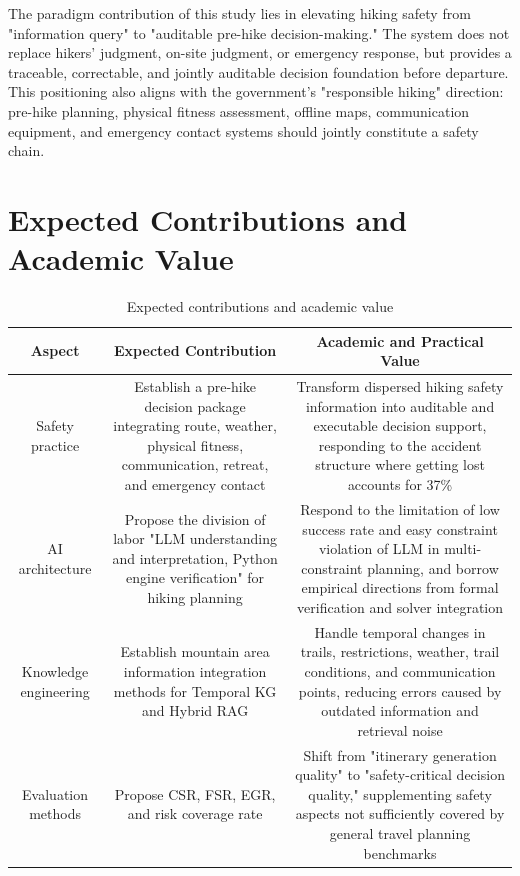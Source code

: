 \documentclass[conference]{IEEEtran}
\begin{document}
The paradigm contribution of this study lies in elevating hiking safety from "information query" to "auditable pre-hike decision-making." The system does not replace hikers' judgment, on-site judgment, or emergency response, but provides a traceable, correctable, and jointly auditable decision foundation before departure. This positioning also aligns with the government's "responsible hiking" direction: pre-hike planning, physical fitness assessment, offline maps, communication equipment, and emergency contact systems should jointly constitute a safety chain.

\section{Expected Contributions and Academic Value}

\begin{table}[htbp]
\caption{Expected contributions and academic value}
\begin{center}
\begin{tabular}{|c|c|c|}
\hline
\textbf{Aspect} & \textbf{Expected Contribution} & \textbf{Academic and Practical Value} \\
\hline
Safety practice & Establish a pre-hike decision package integrating route, weather, physical fitness, communication, retreat, and emergency contact & Transform dispersed hiking safety information into auditable and executable decision support, responding to the accident structure where getting lost accounts for 37\% \\
\hline
AI architecture & Propose the division of labor "LLM understanding and interpretation, Python engine verification" for hiking planning & Respond to the limitation of low success rate and easy constraint violation of LLM in multi-constraint planning, and borrow empirical directions from formal verification and solver integration \\
\hline
Knowledge engineering & Establish mountain area information integration methods for Temporal KG and Hybrid RAG & Handle temporal changes in trails, restrictions, weather, trail conditions, and communication points, reducing errors caused by outdated information and retrieval noise \\
\hline
Evaluation methods & Propose CSR, FSR, EGR, and risk coverage rate & Shift from "itinerary generation quality" to "safety-critical decision quality," supplementing safety aspects not sufficiently covered by general travel planning benchmarks \\

\end{tabular}
\end{center}
\end{table}
\end{document}

